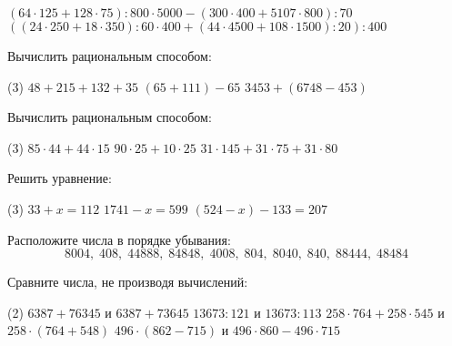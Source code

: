 \begin{class}[number=1]
\begin{listofex}
\begin{tasks}
			\task \( (64\cdot125+128\cdot75):800\cdot5000-(300\cdot400+5107\cdot800):70 \)
			\task \( \left( \left( 24\cdot250+18\cdot350 \right):60\cdot400+\left( 44\cdot4500+108\cdot1500 \right):20 \right):400 \)
		\end{tasks}
		\item Вычислить рациональным способом:
		\begin{tasks}(3)
			\task \( 48+215+132+35 \)
			\task \( (65+111)-65 \)
			\task \( 3453+(6748-453) \)
		\end{tasks}
		\item Вычислить рациональным способом:
		\begin{tasks}(3)
			\task \( 85\cdot44+44\cdot15 \)
			\task \( 90\cdot25+10\cdot25 \)
			\task \( 31\cdot145+31\cdot75+31\cdot80 \)
		\end{tasks}
		\item Решить уравнение:
		\begin{tasks}(3)
			\task \( 33+x=112 \)
			\task \( 1741-x=599 \)
			\task \( (524-x)-133=207 \)
		\end{tasks}
		\item Расположите числа в порядке убывания:
		\[ 8004,\;408,\;44888,\;84848,\;4008,\;804,\;8040,\;840,\;88444,\;48484 \]
		\item Сравните числа, не производя вычислений:
		\begin{tasks}(2)
			\task \( 6387+76345 \) и \( 6387+73645 \)
			\task \( 13673:121 \) и \( 13673:113 \)
			\task \( 258\cdot764 + 258\cdot545 \) и \( 258\cdot(764+548) \)
			\task \( 496\cdot(862-715) \) и \( 496\cdot860-496\cdot715 \)
		\end{tasks}
	\end{listofex}
\end{class}
%
%
%
%
%	
%
%
